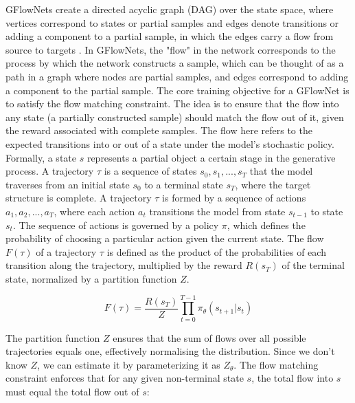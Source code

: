 GFlowNets create a directed acyclic graph (DAG) over the state space, where vertices correspond to states or partial samples and edges denote transitions or adding a component to a partial sample, in which the edges carry a flow from source to targets \cite{bengio2023gflownet, bengio_flow_2021}.
In GFlowNets, the "flow" in the network corresponds to the process by which the network constructs a sample, which can be thought of as a path in a graph where nodes are partial samples, and edges correspond to adding a component to the partial sample.
The core training objective for a GFlowNet is to satisfy the flow matching constraint. The idea is to ensure that the flow into any state (a partially constructed sample) should match the flow out of it, given the reward associated with complete samples. The flow here refers to the expected transitions into or out of a state under the model's stochastic policy. 
Formally, a state \( s \) represents a partial object a certain stage in the generative process. A trajectory \( \tau \) is a sequence of states \( s_0, s_1, ..., s_T \) that the model traverses from an initial state \( s_0 \) to a terminal state \( s_T \), where the target structure is complete.
A trajectory \( \tau \) is formed by a sequence of actions \( a_1, a_2, ..., a_T \), where each action \( a_t \) transitions the model from state \( s_{t-1} \) to state \( s_t \). The sequence of actions is governed by a policy \( \pi \), which defines the probability of choosing a particular action given the current state.
The flow \( F(\tau) \) of a trajectory \( \tau \) is defined as the product of the probabilities of each transition along the trajectory, multiplied by the reward \( R(s_T) \) of the terminal state, normalized by a partition function \( Z \).

\begin{equation} \label{eq:flow}
    F(\tau) = \frac{R(s_T)}{Z} \prod_{t=0}^{T-1} \pi_\theta(s_{t+1} | s_{t})
\end{equation}

The partition function \( Z \) ensures that the sum of flows over all possible trajectories equals one, effectively normalising the distribution. Since we don't know \( Z \), we can estimate it by parameterizing it as \( Z_{\theta} \).
The flow matching constraint enforces that for any given non-terminal state \( s \), the total flow into \( s \) must equal the total flow out of \( s \):


